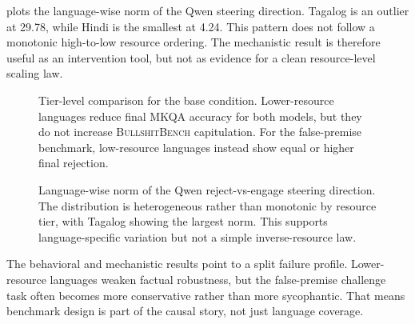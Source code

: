

  plots the language-wise norm of the Qwen steering direction. Tagalog is an outlier at 29.78, while Hindi is the smallest at 4.24. This pattern does not follow a monotonic high-to-low resource ordering. The mechanistic result is therefore useful as an intervention tool, but not as evidence for a clean resource-level scaling law.

\begin{figure}[t]
    \centering
    
    \caption{Tier-level comparison for the base condition. Lower-resource languages reduce final \textsc{MKQA} accuracy for both models, but they do not increase \textsc{BullshitBench} capitulation. For the false-premise benchmark, low-resource languages instead show equal or higher final rejection.}
    \label{fig:tier_comparison}
\end{figure}

\begin{figure}[t]
    \centering
    
    \caption{Language-wise norm of the Qwen reject-vs-engage steering direction. The distribution is heterogeneous rather than monotonic by resource tier, with Tagalog showing the largest norm. This supports language-specific variation but not a simple inverse-resource law.}
    \label{fig:qwen_direction_norms}
\end{figure}

 The behavioral and mechanistic results point to a split failure profile. Lower-resource languages weaken factual robustness, but the false-premise challenge task often becomes more conservative rather than more sycophantic. That means benchmark design is part of the causal story, not just language coverage.
